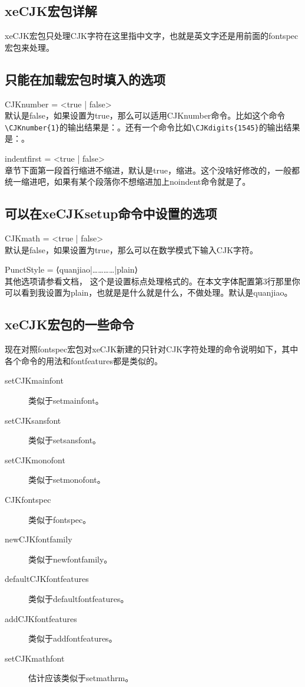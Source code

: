 \documentclass[11pt,oneside]{book}
\begin{document}
\begin{common-format}
\subsection{xeCJK宏包详解}
xeCJK宏包只处理CJK字符在这里指中文字，也就是英文字还是用前面的fontspec宏包来处理。

\subsection{只能在加载宏包时填入的选项}
CJKnumber = <true | false> \\
默认是false，如果设置为true，那么可以适用CJKnumber命令。比如这个命令\verb+\CJKnumber{1}+的输出结果是：。还有一个命令比如\verb+\CJKdigits{1545}+的输出结果是：。

indentfirst = <true | false>\\
章节下面第一段首行缩进不缩进，默认是true，缩进。这个没啥好修改的，一般都统一缩进吧，如果有某个段落你不想缩进加上noindent命令就是了。

\subsection{可以在xeCJKsetup命令中设置的选项}
CJKmath = <true | false>\\
默认是false，如果设置为true，那么可以在数学模式下输入CJK字符。

PunctStyle = {⟨quanjiao|…………|plain⟩}\\
其他选项请参看文档， 这个是设置标点处理格式的。在本文字体配置第3行那里你可以看到我设置为plain，也就是是什么就是什么，不做处理。默认是quanjiao。

\subsection{xeCJK宏包的一些命令}
现在对照fontspec宏包对xeCJK新建的只针对CJK字符处理的命令说明如下，其中各个命令的用法和fontfeatures都是类似的。
\begin{description}
\item[setCJKmainfont] 类似于setmainfont。
\item[setCJKsansfont] 类似于setsansfont。
\item[setCJKmonofont] 类似于setmonofont。
\item[CJKfontspec] 类似于fontspec。
\item[newCJKfontfamily] 类似于newfontfamily。
\item[defaultCJKfontfeatures] 类似于defaultfontfeatures。
\item[addCJKfontfeatures] 类似于addfontfeatures。
\item[setCJKmathfont] 估计应该类似于setmathrm。
\end{description}


\end{common-format}
\end{document}
